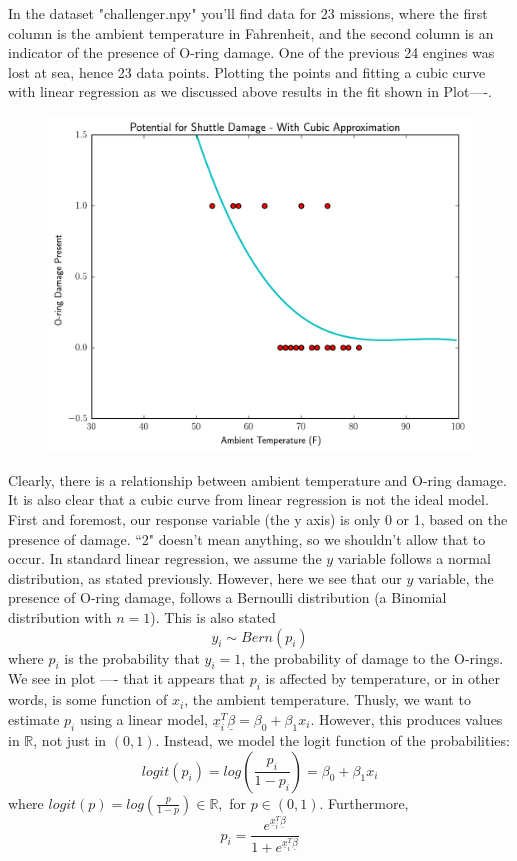 In the dataset "challenger.npy" you'll find data for 23 missions, where the first column is the ambient temperature in Fahrenheit, and the second column is an indicator of the presence of O-ring damage. 
One of the previous 24 engines was lost at sea, hence 23 data points.
Plotting the points and fitting a cubic curve with linear regression as we discussed above results in the fit shown in Plot----. 

\begin{figure}
\label{badfit}
\includegraphics[width=\textwidth]{cubicthrulogitpoints.pdf}
\end{figure}

Clearly, there is a relationship between ambient temperature and O-ring damage.
It is also clear that a cubic curve from linear regression is not the ideal model.
First and foremost, our response variable (the y axis) is only 0 or 1, based on the presence of damage.
``2" doesn't mean anything, so we shouldn't allow that to occur.
In standard linear regression, we assume the $y$ variable follows a normal distribution, as stated previously.
However, here we see that our $y$ variable, the presence of O-ring damage, follows a Bernoulli distribution (a Binomial distribution with $n=1$). 
This is also stated 
\[y_i \sim Bern(p_i)\] 
where $p_i$ is the probability that $y_i=1$, the probability of damage to the O-rings. We see in plot ---- that it appears that $p_i$ is affected by temperature, or in other words, is some function of $x_i$, the ambient temperature.
Thusly, we want to estimate $p_i$ using a linear model, $\underline{x}^T_i \underline{\beta} = \beta_0 + \beta_1x_i$.
However, this produces values in $\mathbb{R}$, not just in $(0,1)$.
Instead, we model the logit function of the probabilities: 
\[logit(p_i) = log \left(\frac{p_i}{1 - p_i}\right) = \beta_0 + \beta_1x_i\]
where $logit(p) = log(\frac{p}{1-p}) \in \mathbb{R},$ for $p \in (0,1)$.
Furthermore, 
\[p_i = \frac{e^{\underline{x}^T_i\underline{\beta}}}{1+e^{\underline{x}^T_i\underline{\beta}}}\]

